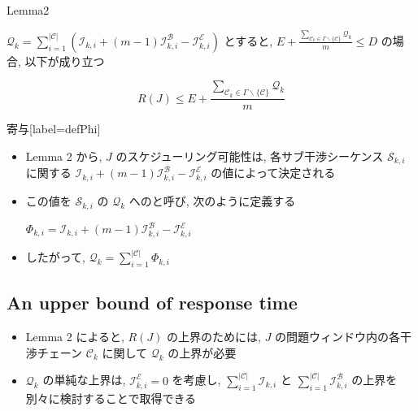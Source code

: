 \begin{frame}{Lemma2}
    \begin{lemma}[]
        $\mathcal{Q}_{k}=\sum_{i=1}^{|\mathcal{C}|}\left(\mathcal{I}_{k, i}+(m-1) \mathcal{I}_{k, i}^{\mathcal{B}}-\mathcal{I}_{k, i}^{\mathcal{E}}\right)$ とすると,
        $E+\frac{\sum_{\mathcal{C}_{k} \in \Gamma \backslash\{\mathcal{C}\}} \mathcal{Q}_{k}}{m} \leq D$ の場合, 以下が成り立つ

        \begin{equation*}
            R(J) \leq E+\frac{\sum_{\mathcal{C}_{k} \in \Gamma \backslash\{\mathcal{C}\}} \mathcal{Q}_{k}}{m}
        \end{equation*}
    \end{lemma}
\end{frame}

\begin{frame}{寄与}[label=defPhi]
    \begin{itemize}
        \item Lemma 2 から, $J$ のスケジューリング可能性は, 各サブ干渉シーケンス $\mathcal{S}_{k, i}$ に関する $\mathcal{I}_{k, i}+(m-1) \mathcal{I}_{k, i}^{\mathcal{B}}-\mathcal{I}_{k, i}^{\mathcal{E}}$ の値によって決定される
        \item この値を $\mathcal{S}_{k, i}$ の $\mathcal{Q}_{k}$ へのと呼び, 次のように定義する
              \begin{definition}
                  $\Phi_{k, i}=\mathcal{I}_{k, i}+(m-1) \mathcal{I}_{k, i}^{\mathcal{B}}-\mathcal{I}_{k, i}^{\mathcal{E}}$
              \end{definition}
              \vspace{5mm}
        \item したがって, $\mathcal{Q}_{k}=\sum_{i=1}^{|\mathcal{C}|} \Phi_{k, i}$
    \end{itemize}
\end{frame}


\subsection{An upper bound of response time}
\label{ssec: an_upper_bound_of_response_time}

\begin{frame}{}
    \begin{itemize}
        \item Lemma 2 によると, $R(J)$ の上界のためには, $J$ の問題ウィンドウ内の各干渉チェーン $\mathcal{C}_{k}$ に関して $\mathcal{Q}_{k}$ の上界が必要
        \item $\mathcal{Q}_{k}$ の単純な上界は, $\mathcal{I}_{k, i}^{\mathcal{E}}=0$ を考慮し, $\sum_{i=1}^{|\mathcal{C}|} \mathcal{I}_{k, i}$ と $\sum_{i=1}^{|\mathcal{C}|} \mathcal{I}_{k, i}^{\mathcal{B}}$ の上界を別々に検討することで取得できる
    \end{itemize}
\end{frame}

